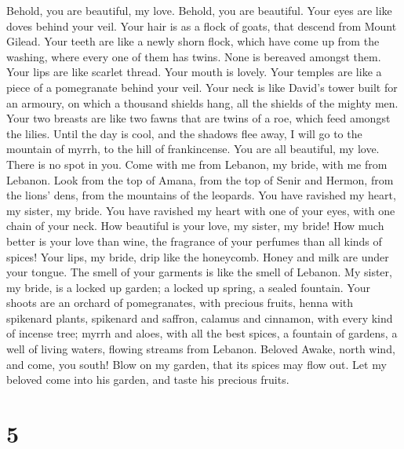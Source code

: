  Behold, you are beautiful, my love. Behold, you are
beautiful. Your eyes are like doves behind your veil. Your hair is as a
flock of goats, that descend from Mount Gilead.  Your teeth
are like a newly shorn flock, which have come up from the washing, where
every one of them has twins. None is bereaved amongst them. 
Your lips are like scarlet thread. Your mouth is lovely. Your temples
are like a piece of a pomegranate behind your veil.  Your
neck is like David's tower built for an armoury, on which a thousand
shields hang, all the shields of the mighty men.  Your two
breasts are like two fawns that are twins of a roe, which feed amongst
the lilies.  Until the day is cool, and the shadows flee
away, I will go to the mountain of myrrh, to the hill of frankincense.
 You are all beautiful, my love. There is no spot in you.
 Come with me from Lebanon, my bride, with me from Lebanon.
Look from the top of Amana, from the top of Senir and Hermon, from the
lions' dens, from the mountains of the leopards.  You have
ravished my heart, my sister, my bride. You have ravished my heart with
one of your eyes, with one chain of your neck.  How
beautiful is your love, my sister, my bride! How much better is your
love than wine, the fragrance of your perfumes than all kinds of spices!
 Your lips, my bride, drip like the honeycomb. Honey and
milk are under your tongue. The smell of your garments is like the smell
of Lebanon.  My sister, my bride, is a locked up garden; a
locked up spring, a sealed fountain.  Your shoots are an
orchard of pomegranates, with precious fruits, henna with spikenard
plants,  spikenard and saffron, calamus and cinnamon, with
every kind of incense tree; myrrh and aloes, with all the best spices,
 a fountain of gardens, a well of living waters, flowing
streams from Lebanon. Beloved  Awake, north wind, and come,
you south! Blow on my garden, that its spices may flow out. Let my
beloved come into his garden, and taste his precious fruits.

\hypertarget{section-4}{%
\section{5}\label{section-4}}

